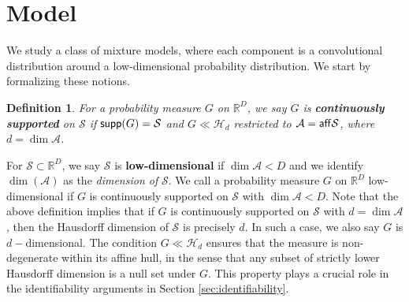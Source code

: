 \documentclass[bj,authoryear]{imsart}
\theoremstyle{plain}
\newtheorem{definition}{Definition}[section]
\theoremstyle{remark}
\def\aff{{\sf aff}}
\def\bbR{\mathbb{R}}
\def\cA{\mathcal{A}}
\def\cH{\mathcal{H}}
\def\cS{\mathcal{S}}
\def\supp{{\sf supp}}
\begin{document}
\section{Model}\label{sec:model}
We study a class of mixture models, where each component is a convolutional distribution around a low-dimensional probability distribution. We start by formalizing these notions. 

\begin{definition}\label{def:low-dim}
    For a probability measure $G$ on $\bbR^D$, we say $G$ is \textbf{continuously supported} on $\cS$ if $\supp(G)=\cS$ and $G\ll \cH_d$ restricted to $\cA=\aff \cS$, where $d=\dim \cA$. 
\end{definition}

For $\cS\subset \bbR^D$, we say $\cS$ is \textbf{low-dimensional} if $\dim \cA < D$ and we identify $\dim(\cA)$ as the \textit{dimension of } $\cS$. We call a probability measure $G$ on $\bbR^D$ low-dimensional if $G$ is continuously supported on $\cS$ with $\dim \cA<D$. Note that the above definition implies that if $G$ is continuously supported on $\cS$ with $d=\dim \cA$, then the Hausdorff dimension of $\cS$ is precisely $d$. In such a case, we also say $G$ is $d-$dimensional. The condition $G\ll \cH_d$ ensures that the measure is non-degenerate within its affine hull, in the sense that any subset of strictly lower Hausdorff dimension is a null set under $G$. This property plays a crucial role in the identifiability arguments in Section \ref{sec:identifiability}. 
\end{document}
